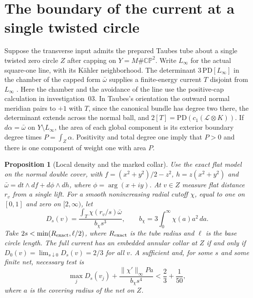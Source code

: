 \documentclass[11pt,letterpaper]{article}
\numberwithin{equation}{section}
\newtheorem{proposition}[theorem]{Proposition}
\begin{document}
\section{The boundary of the current at a single twisted circle}

Suppose the transverse input admits the prepared Taubes tube about a single
twisted zero circle $Z$ after capping on $Y=M\#\mathbb{CP}^2$. Write
$L_\infty$ for the actual square-one line, with its Kähler neighborhood.
The determinant $3\,\mathrm{PD}[L_\infty]$ in the chamber of the capped
form $\bar\omega$ supplies a finite-energy current $T$ disjoint from
$L_\infty$ \cite[Theorem~2.2 and \S7(f)]{Taubes1999SelfDualHarmonic}.
Here the chamber and the avoidance of the line use the positive-cap
calculation in investigation~03. In Taubes's orientation the outward
normal meridian pairs to $+1$ with $T$, since the canonical bundle has
degree two there, the determinant extends across the normal ball, and
$2[T]=\mathrm{PD}(c_1(\mathcal L\otimes K))$. If $d\alpha=\bar\omega$ on $Y\setminus L_\infty$,
the area of each global component is its exterior boundary degree times
$P=\int_Z\alpha$. Positivity and total degree one imply that $P>0$ and
there is one component of weight one with area $P$.

\begin{proposition}[Local density and the marked collar]\label{prop:twisted-collar}
Use the exact flat model on the normal double cover, with
$f=(x^2+y^2)/2-z^2$, $h=z(x^2+y^2)$ and
$\bar\omega=dt\wedge df+d\phi\wedge dh$, where $\phi=\arg(x+iy)$.
At $v\in Z$ measure flat distance $r_v$ from a single lift.
For a smooth nonincreasing radial cutoff $\chi$, equal to one on $[0,1]$
and zero on $[2,\infty)$, let
\[
 D_s(v)=\frac{\int_T\chi(r_v/s)\bar\omega}{b_\chi s^3},
 \qquad b_\chi=3\int_0^\infty \chi(a)a^2\,da .
\]
Take $2s<\min(R_{\rm exact},\ell/2)$, where $R_{\rm exact}$ is
the tube radius and $\ell$ is the base circle length. The full current has an embedded annular collar at $Z$ if and only if
$D_0(v)=\lim_{s\downarrow0}D_s(v)=2/3$ for all $v$. A sufficient and,
for some $s$ and some finite net, necessary test is
\[
 \max_j D_s(v_j)+\frac{\|\chi'\|_\infty P a}{b_\chi s^4}
       <\frac23+\frac1{50},
\]
where $a$ is the covering radius of the net on $Z$.
\end{proposition}
\end{document}
